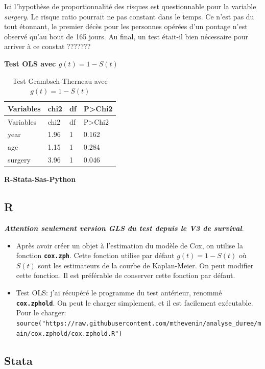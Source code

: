 \documentclass[
  12pt,
  letterpaper,
  DIV=11,
  numbers=noendperiod,
  onepage,
  openany]{scrreprt}
\providecommand{\tightlist}{%
  \setlength{\itemsep}{0pt}\setlength{\parskip}{0pt}}\usepackage{longtable,booktabs,array}
\begin{document}
Ici l'hypothèse de proportionnalité des risques est questionnable pour
la variable \emph{surgery}. Le risque ratio pourrait ne pas constant
dans le temps. Ce n'est pas du tout étonnant, le premier décès pour les
personnes opérées d'un pontage n'est observé qu'au bout de 165 jours. Au
final, un test était-il bien nécessaire pour arriver à ce constat
???????

\textbf{Test OLS avec \(g(t)=1- S(t)\)}

\begin{longtable}[]{@{}llll@{}}
\caption{Test Grambsch-Therneau avec \(g(t)=1- S(t)\)}\tabularnewline
\toprule\noalign{}
Variables & chi2 & df & P\textgreater Chi2 \\
\midrule\noalign{}
\endfirsthead
\toprule\noalign{}
Variables & chi2 & df & P\textgreater Chi2 \\
\midrule\noalign{}
\endhead
\bottomrule\noalign{}
\endlastfoot
year & 1.96 & 1 & 0.162 \\
age & 1.15 & 1 & 0.284 \\
surgery & 3.96 & 1 & 0.046 \\
\end{longtable}

\textbf{R-Stata-Sas-Python}

\subsection{R}

\textbf{\emph{Attention seulement version GLS du test depuis le V3 de
survival}}.

\begin{itemize}
\tightlist
\item
  Après avoir créer un objet à l'estimation du modèle de Cox, on utilise
  la fonction \textbf{\texttt{cox.zph}}. Cette fonction utilise par
  défaut \(g(t)=1-S(t)\) où \(S(t)\) sont les estimateurs de la courbe
  de Kaplan-Meier. On peut modifier cette fonction. Il est préférable de
  conserver cette fonction par défaut.
\item
  Test OLS: j'ai récupéré le programme du test antérieur, renommé
  \textbf{\texttt{cox.zphold}}. On peut le charger simplement, et il est
  facilement exécutable. Pour le charger:
  \texttt{source("https://raw.githubusercontent.com/mthevenin/analyse\_duree/main/cox.zphold/cox.zphold.R")}
\end{itemize}

\subsection{Stata}
\end{document}
